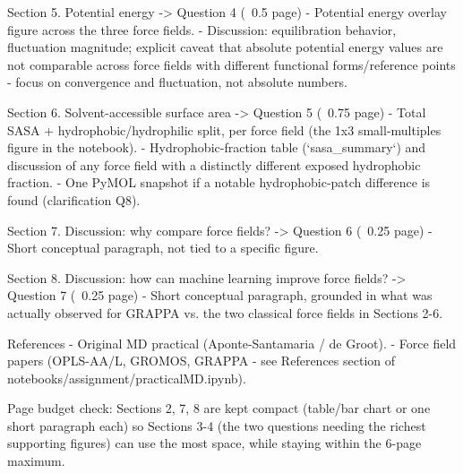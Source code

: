 Section 5. Potential energy -> Question 4 (~0.5 page)
- Potential energy overlay figure across the three force fields.
- Discussion: equilibration behavior, fluctuation magnitude; explicit caveat that absolute
  potential energy values are not comparable across force fields with different functional
  forms/reference points - focus on convergence and fluctuation, not absolute numbers.

Section 6. Solvent-accessible surface area -> Question 5 (~0.75 page)
- Total SASA + hydrophobic/hydrophilic split, per force field (the 1x3 small-multiples
  figure in the notebook).
- Hydrophobic-fraction table (`sasa_summary`) and discussion of any force field with a
  distinctly different exposed hydrophobic fraction.
- One PyMOL snapshot if a notable hydrophobic-patch difference is found (clarification Q8).

Section 7. Discussion: why compare force fields? -> Question 6 (~0.25 page)
- Short conceptual paragraph, not tied to a specific figure.

Section 8. Discussion: how can machine learning improve force fields? -> Question 7 (~0.25 page)
- Short conceptual paragraph, grounded in what was actually observed for GRAPPA vs. the two
  classical force fields in Sections 2-6.

References
- Original MD practical (Aponte-Santamaria / de Groot).
- Force field papers (OPLS-AA/L, GROMOS, GRAPPA - see References section of
  notebooks/assignment/practicalMD.ipynb).

Page budget check: Sections 2, 7, 8 are kept compact (table/bar chart or one short paragraph
each) so Sections 3-4 (the two questions needing the richest supporting figures) can use the
most space, while staying within the 6-page maximum.
